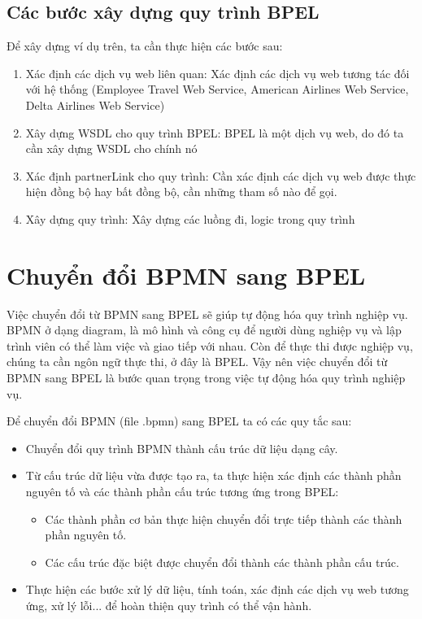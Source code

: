 \subsection{Các bước xây dựng quy trình BPEL}
Để xây dựng ví dụ trên, ta cần thực hiện các bước sau:
\begin{enumerate}
    \item Xác định các dịch vụ web liên quan: Xác định các dịch vụ web tương tác đối với hệ thống (Employee Travel Web Service, American Airlines Web Service, Delta Airlines Web Service)
    \item Xây dựng WSDL cho quy trình BPEL: BPEL là một dịch vụ web, do đó ta cần xây dựng WSDL cho chính nó
    \item Xác định partnerLink cho quy trình: Cần xác định các dịch vụ web được thực hiện đồng bộ hay bất đồng bộ, cần những tham số nào để gọi.
    \item Xây dựng quy trình: Xây dựng các luồng đi, logic trong quy trình
\end{enumerate}



\section{Chuyển đổi BPMN sang BPEL}
\hspace*{0.5cm} \par Việc chuyển đổi từ BPMN sang BPEL sẽ giúp tự động hóa quy trình nghiệp vụ. BPMN ở dạng diagram, là mô hình và công cụ để người dùng nghiệp vụ và lập trình viên có thể làm việc và giao tiếp với nhau.
Còn để thực thi được nghiệp vụ, chúng ta cần ngôn ngữ thực thi, ở đây là BPEL. Vậy nên việc chuyển đổi từ BPMN sang BPEL là bước quan trọng trong việc tự động hóa quy trình nghiệp vụ.

\par Để chuyển đổi BPMN (file .bpmn) sang BPEL ta có các quy tắc sau:
\begin{itemize}
    \item Chuyển đổi quy trình BPMN thành cấu trúc dữ liệu dạng cây.
    \item Từ cấu trúc dữ liệu vừa được tạo ra, ta thực hiện xác định các thành phần nguyên tố và các thành phần cấu trúc tương ứng trong BPEL:
          \begin{itemize}
              \item Các thành phần cơ bản thực hiện chuyển đổi trực tiếp thành các thành phần nguyên tố.
              \item Các cấu trúc đặc biệt được chuyển đổi thành các thành phần cấu trúc.
          \end{itemize}
    \item Thực hiện các bước xử lý dữ liệu, tính toán, xác định các dịch vụ web tương ứng, xử lý lỗi... để hoàn thiện quy trình có thể vận hành.
\end{itemize}

